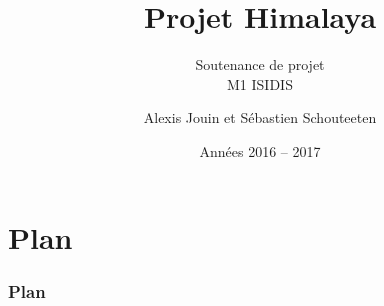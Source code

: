 \documentclass{beamer}
\begin{document}
	\title{\textbf{Projet Himalaya}}
	\subtitle{Soutenance de projet\\
		{\footnotesize M1 ISIDIS}}
	\author {Alexis Jouin et Sébastien Schouteeten}
	\date{Années 2016 -- 2017}
	\frame[plain]{
		\titlepage
	}
	
	
	\section{Plan}
	\begin{frame} 
		\frametitle{Plan}
		\tableofcontents
	\end{frame}

	

	
	
	
	
	
	
	
	
	
	
	
	
\end{document}
